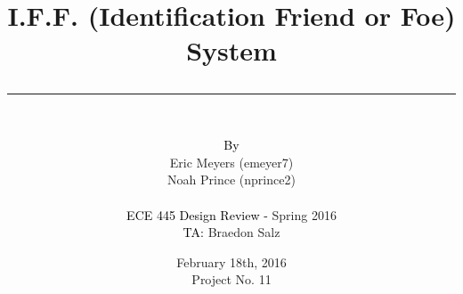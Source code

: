 \documentclass[letterpaper,10pt]{article}
\author{\vspace{.4in}\\
	\textcolor{black}{By}\\
	#1
	\vspace{1in}\\
	\textcolor{black}{ECE 445 Design Review -} #2\\
	\textcolor{black}{TA:} #3
	\vspace{1in}}
\newcommand{\thetitle}[1]{\title{\begin{huge}{\bf #1}\end{huge} \color{subtitlecolor}\rule[25pt]{\textwidth}{1pt}}}
\newcommand{\theauthor}[3]{
	\author{\vspace{.4in}\\
	\textcolor{black}{By}\\
	#1
	\vspace{1in}\\
	\textcolor{black}{ECE 445 Design Review -} #2\\
	\textcolor{black}{TA:} #3
	\vspace{1in}}
}
\begin{document}
\pagestyle{empty}
\doublespacing

\thetitle{{I.F.F. (Identification Friend or Foe) System}}

\theauthor{
	{Eric Meyers (emeyer7)}\\
	{Noah Prince (nprince2)}\\
}
{ %
	{Spring 2016}
}
{ %
	{Braedon Salz}
}

\date{
{February 18th, 2016}\\
Project No. 11
\clearpage
}
\end{document}
